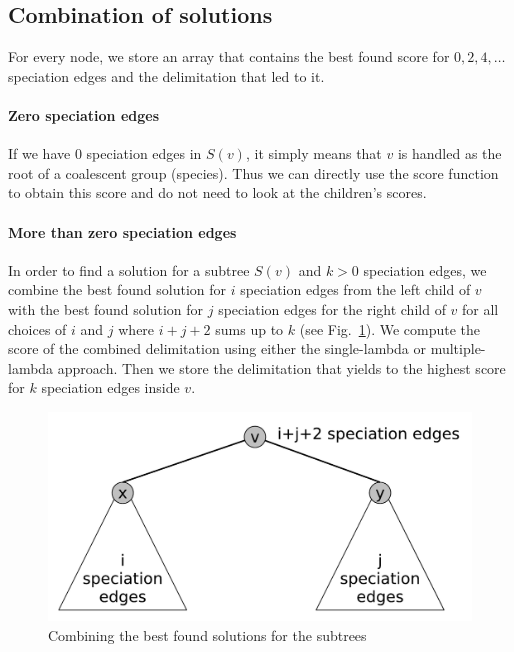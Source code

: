 \documentclass{llncs}
\begin{document}
\subsection{Combination of solutions}

For every node, we store an array that contains the best found score for $0, 2, 4, \ldots$ speciation edges and the delimitation that led to it.

\paragraph{Zero speciation edges}
If we have $0$ speciation edges in $S(v)$, it simply means that $v$ is handled as the root of a coalescent group (species). Thus we can directly use the score function to obtain this score and do not need to look at the children's scores.

\paragraph{More than zero speciation edges}
In order to find a solution for a subtree $S(v)$ and $k>0$ speciation edges, we combine the best found solution for $i$ speciation edges from the left child of $v$ with the best found solution for $j$ speciation edges for the right child of $v$ for all choices of $i$ and $j$ where $i+j+2$ sums up to $k$ (see Fig.~\ref{fig:combining}). We compute the score of the combined delimitation using either the single-lambda or multiple-lambda approach. Then we store the delimitation that yields to the highest score for $k$ speciation edges inside $v$.

\begin{figure}[h!]
\centering
\includegraphics[scale=0.3]{images/speciation_events.pdf}
\caption{Combining the best found solutions for the subtrees}
\label{fig:combining}
\end{figure}
\end{document}
